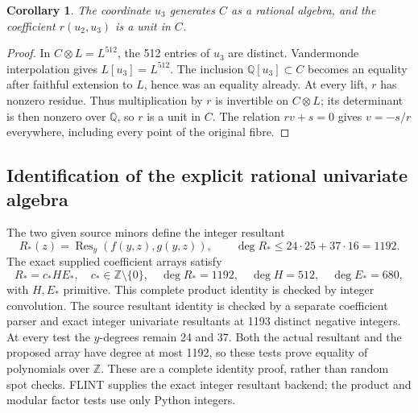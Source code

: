 \documentclass[11pt,a4paper]{article}
\newtheorem{corollary}[theorem]{Corollary}\newtheorem{definition}[theorem]{Definition}
\theoremstyle{remark}\newtheorem{remark}[theorem]{Remark}
\begin{document}
\begin{corollary}\label{centre:primitive}
The coordinate $u_3$ generates $C$ as a rational algebra, and the
coefficient $r(u_2,u_3)$ is a unit in $C$.
\end{corollary}
\begin{proof}
In $C\otimes L=L^{512}$, the 512 entries of $u_3$ are distinct.
Vandermonde interpolation gives $L[u_3]=L^{512}$. The inclusion
$\mathbb Q[u_3]\subset C$ becomes an equality after faithful extension
to $L$, hence was an equality already. At every lift, $r$ has nonzero
residue. Thus multiplication by $r$ is invertible on $C\otimes L$;
its determinant is then nonzero over $\mathbb Q$, so $r$ is a unit in
$C$. The relation $rv+s=0$ gives $v=-s/r$ everywhere, including every
point of the original fibre.
\end{proof}

\subsection{Identification of the explicit rational univariate algebra}
The two given source minors define the integer resultant
\[
 R_*(z)=\operatorname{Res}_y(f(y,z),g(y,z)),\qquad
 \deg R_*\le24\cdot25+37\cdot16=1192.
\]
The exact supplied coefficient arrays satisfy
\begin{equation}\label{centre:factorization}
 R_*=c_*HE_*,\quad c_*\in\mathbb Z\setminus\{0\},\quad
 \deg R_*=1192,\quad\deg H=512,\quad\deg E_*=680,
\end{equation}
with $H,E_*$ primitive. This complete product identity is checked by
integer convolution. The source resultant identity is checked by a
separate coefficient parser and exact integer univariate resultants at
1193 distinct negative integers. At every test the $y$-degrees remain
24 and 37. Both the actual resultant and the proposed array have degree
at most 1192, so these tests prove equality of polynomials over
$\mathbb Z$. These are a complete identity proof, rather than random
spot checks. FLINT supplies the exact integer resultant backend;
the product and modular factor tests use only Python integers.
\end{document}
